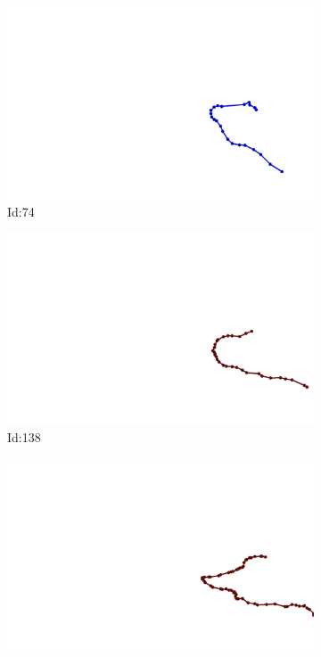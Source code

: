 \documentclass[12pt,twoside]{report}
\begin{document}
\begin{figure}
\centering
\begin{subfigure}[b]{0.20\textwidth}
\centering
\includegraphics[width=\textwidth]{../../trajectories/74.png}
\caption{Id:74}
\end{subfigure}
\begin{subfigure}[b]{0.20\textwidth}
\centering
\includegraphics[width=\textwidth]{../../trajectories/138.png}
\caption{Id:138}
\end{subfigure}
\begin{subfigure}[b]{0.20\textwidth}
\centering
\includegraphics[width=\textwidth]{../../trajectories/145.png}

\end{subfigure}
\end{figure}
\end{document}
